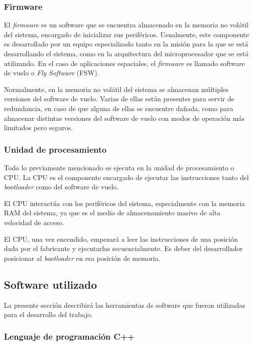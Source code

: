 \subsubsection{Firmware}
\label{subsec:firmware}

El \textit{firmware} es un software que se encuentra almacenado en la memoria no volátil del sistema, encargado de inicializar sus periféricos. Usualmente, este componente es desarrollado por un equipo especializado tanto en la misión para la que se está desarrollando el sistema, como en la arquitectura del microprocesador que se está utilizando. En el caso de aplicaciones espaciales, el \textit{firmware} es llamado software de vuelo o \textit{Fly Software} (FSW).

Normalmente, en la memoria no volátil del sistema se almacenan múltiples versiones del software de vuelo. Varias de ellas están presentes para servir de redundancia, en caso de que alguna de ellas se encuentre dañada, como para almacenar distintas versiones del software de vuelo con modos de operación más limitados pero seguros.

\subsubsection{Unidad de procesamiento}
\label{subsec:unidad_procesamiento}
Todo lo previamente mencionado se ejecuta en la unidad de procesamiento o CPU. La CPU es el componente encargado de ejecutar las instrucciones tanto del \textit{bootloader} como del software de vuelo.

El CPU interactúa con los periféricos del sistema, especialmente con la memoria RAM del sistema, ya que es el medio de almacenamiento masivo de alta velocidad de acceso.

El CPU, una vez encendido, empezará a leer las instrucciones de una posición dada por el fabricante y ejecutarlas secuencialmente. Es deber del desarrollador posicionar al \textit{bootloader} en esa posición de memoria.

\subsection{Software utilizado}
\label{subsec:software_utilizado}

La presente sección describirá las herramientas de software que fueron utilizadas para el desarrollo del trabajo.

\subsubsection{Lenguaje de programación C++}
\label{subsec:cpp}

